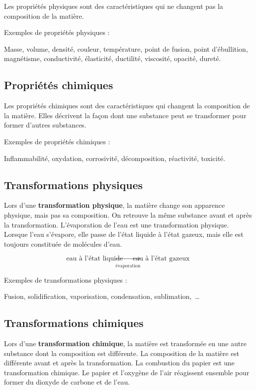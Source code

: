 \documentclass[
  11pt,
  a4paper,
  openany]{book}
\begin{document}
Les propriétés physiques sont des caractéristiques qui ne changent pas la composition de la matière.

Exemples de propriétés physiques :

Masse, volume, densité, couleur, température, point de fusion, point d'ébullition, magnétisme, conductivité, élasticité, ductilité, viscosité, opacité, dureté.

\hypertarget{propriuxe9tuxe9s-chimiques}{%
\subsection{Propriétés chimiques}\label{propriuxe9tuxe9s-chimiques}}

Les propriétés chimiques sont des caractéristiques qui changent la composition de la matière. Elles décrivent la façon dont une substance peut se transformer pour former d'autres substances.

Exemples de propriétés chimiques :

Inflammabilité, oxydation, corrosivité, décomposition, réactivité, toxicité.

\hypertarget{transformations-physiques}{%
\subsection{Transformations physiques}\label{transformations-physiques}}

Lors d'une \textbf{transformation physique}, la matière change son apparence physique, mais pas sa composition. On retrouve la même substance avant et après la transformation. L'évaporation de l'eau est une transformation physique. Lorsque l'eau s'évapore, elle passe de l'état liquide à l'état gazeux, mais elle est toujours constituée de molécules d'eau.

\[ \underset{\text{évaporation}}{\text{eau à l'état liquide} \ \longrightarrow \ \text{eau à l'état gazeux}} \]

Exemples de transformations physiques :

Fusion, solidification, vaporisation, condensation, sublimation,~\ldots{}

\hypertarget{transformations-chimiques}{%
\subsection{Transformations chimiques}\label{transformations-chimiques}}

Lors d'une \textbf{transformation chimique}, la matière est transformée en une autre substance dont la composition est différente. La composition de la matière est différente avant et après la transformation. La combustion du papier est une transformation chimique. Le papier et l'oxygène de l'air réagissent ensemble pour former du dioxyde de carbone et de l'eau.
\end{document}
